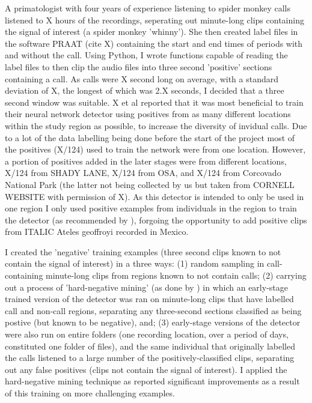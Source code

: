 \documentclass[11pt]{article}
\begin{document}
A primatologist with four years of experience listening to spider monkey calls listened to X hours of the recordings, seperating out minute-long clips containing the signal of interest (a spider monkey 'whinny'). She then created label files in the software PRAAT (cite X) containing the start and end times of periods with and without the call. Using Python, I wrote functions capable of reading the label files to then clip the audio files into three second 'positive' sections containing a call. As calls were X second long on average, with a standard deviation of X, the longest of which was 2.X seconds, I decided that a three second window was suitable. X et al reported that it was most beneficial to train their neural network detector using positives from as many different locations within the study region as possible, to increase the diversity of invidual calls. Due to a lot of the data labelling being done before the start of the project most of the positives (X/124) used to train the network were from one location. However, a portion of positives added in the later stages were from different locations, X/124 from SHADY LANE, X/124 from OSA, and X/124 from Corcovado National Park (the latter not being collected by us but taken from CORNELL WEBSITE with permission of X). As this detector is intended to only be used in one region I only used positive examples from individuals in the region to train the detector (as recommended by \cite{knight2017recommendations}), forgoing the opportunity to add positive clips from ITALIC Ateles geoffroyi recorded in Mexico.

I created the 'negative' training examples (three second clips known to not contain the signal of interest) in a three ways: (1) random sampling in call-containing minute-long clips from regions known to not contain calls; (2) carrying out a process of 'hard-negative mining' (as done by \cite{mac2018bat}) in which an early-stage trained version of the detector was ran on minute-long clips that have labelled call and non-call regions, separating any three-second sections classified as being postive (but known to be negative), and; (3) early-stage versions of the detector were also run on entire folders (one recording location, over a period of days, constituted one folder of files), and the same individual that originally labelled the calls listened to a large number of the positively-classified clips, separating out any false positives (clips not contain the signal of interest). I applied the hard-negative mining technique as \cite{mac2018bat} reported significant improvements as a result of this training on more challenging examples. 
\end{document}
